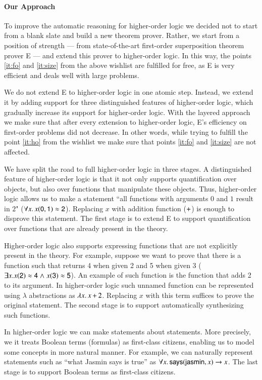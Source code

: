\paragraph{Our Approach} To improve the automatic reasoning for higher-order
logic we decided not to start from a blank slate and build a new theorem prover.
Rather, we start from a position of strength --- from state-of-the-art
first-order superposition theorem prover E \cite{scv-19-e23} --- and extend this
prover to higher-order logic. In this way, the points \ref{it:fo} and
\ref{it:size} from the above wishlist are fulfilled for free, as E is very
efficient and deals well with large problems.

We do not extend E to higher-order logic in one atomic step. Instead, we extend
it by adding support for three distinguished features of higher-order logic,
which gradually increase its support for higher-order logic. With the layered
approach we make sure that after every extension to higher-order logic, E's
efficiency on first-order problems did not decrease. In other words, while trying
to fulfill the point \ref{it:ho} from the wishlist we make sure that points
\ref{it:fo} and \ref{it:size} are not affected.

We have split the road to full higher-order logic in three stages. A
distinguished feature of higher-order logic is that it not only supports
quantification over objects, but also over functions that manipulate these
objects. Thus, higher-order logic allows us to make a statement ``all functions
with arguments $0$ and $1$ result in $2$" ($\forall x. \,  x (\mathsf{0}, \mathsf{1}) \approx
\mathsf{2}$). Replacing $x$ with addition function ($\mathsf{+}$) is enough to
disprove this statement. The first stage is to extend E to support
quantification over functions that are already present in the theory.

Higher-order logic also supports expressing functions that are not explicitly
present in the theory. For example, suppose we want to prove that there is a
function such that returns 4 when given 2 and 5 when given 3 ($\exists x.
x(\mathsf{2}) \approx \mathsf{4} \mathrel\land x (\mathsf{3}) \approx \mathsf{5} $). An example of such
function is the function that adds 2 to its argument. In higher-order logic such
unnamed function can be represented using $\lambda$ abstractions as $\lambda
x.\, x \, \mathsf{+} \, 2$. Replacing $x$ with this term suffices to prove the
original statement. The second stage is to support automatically synthesizing
such functions.

In higher-order logic we can make statements about statements. More precisely,
we it treats Boolean terms (formulas) as first-class citizens, enabling us to
model some concepts in more natural manner. For example, we can naturally
represent statements such as ``what Jasmin says is true'' as $\forall x. \,
\mathsf{says}(\mathsf{jasmin}, x) \rightarrow x$. The last stage is to support Boolean terms
as first-class citizens.
\pagebreak[2]

